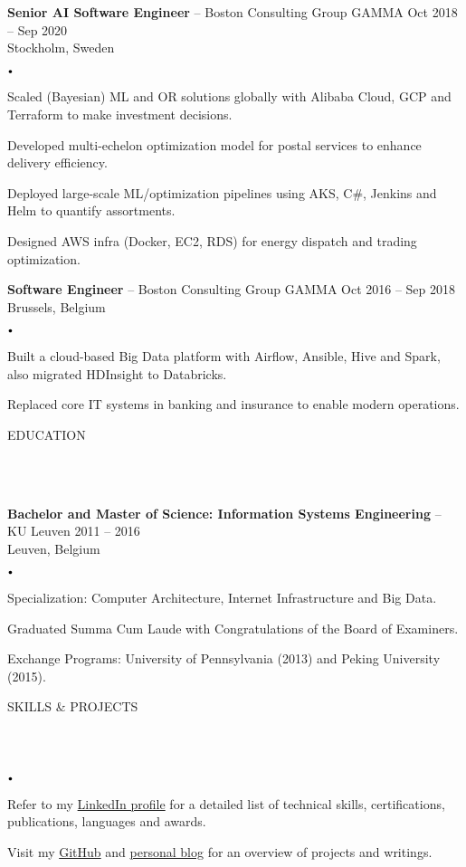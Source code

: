 \documentclass{article}
\newcommand{\header}[1]{
    {
        \hspace*{-4pt}
        \vspace*{8pt}
        \uppercase{#1}
    }
    \vspace*{-4pt} 
    \lineunder
    \vspace*{8pt}
}
\newcommand{\lineunder}{
    \vspace*{-8pt} \\ 
    \hspace*{-4pt} 
    \hrulefill \\
}
\newcommand{\experience}[5]{
    \vspace*{2pt}
    \textbf{#1} -- #2 \hfill #3 \\ 
    #4 \\
    #5
    \vspace*{2pt}
}
\newcommand{\spacedbullet}{
    $\vcenter{\hbox{\tiny$\bullet$}}$\hspace*{-2pt}
}
\newenvironment{bulletlist}{
    \begin{list}
        {\spacedbullet}{\setlength\leftmargin{10pt} 
        \topsep 0pt \itemsep -2pt}}{\vspace*{4pt}
    \end{list}
}
\begin{document}
\experience{Senior AI Software Engineer}{Boston Consulting Group GAMMA}{Oct 2018 -- Sep 2020}{Stockholm, Sweden}
{
    \begin{bulletlist}
        \item Scaled (Bayesian) ML and OR solutions globally with Alibaba Cloud, GCP and Terraform to make investment decisions.
        \item Developed multi-echelon optimization model for postal services to enhance delivery efficiency.
        \item Deployed large-scale ML/optimization pipelines using AKS, C\#, Jenkins and Helm to quantify assortments.
        \item Designed AWS infra (Docker, EC2, RDS) for energy dispatch and trading optimization.
    \end{bulletlist}
}

\experience{Software Engineer}{Boston Consulting Group GAMMA}{Oct 2016 -- Sep 2018}{Brussels, Belgium}
{
    \begin{bulletlist}
        \item Built a cloud-based Big Data platform with Airflow, Ansible, Hive and Spark, also migrated HDInsight to Databricks.
        \item Replaced core IT systems in banking and insurance to enable modern operations.
    \end{bulletlist}
}

\vspace*{4pt}

\header{Education}
\experience{Bachelor and Master of Science: Information Systems Engineering}{KU Leuven}{2011 -- 2016}{Leuven, Belgium}
{
    \begin{bulletlist}
        \item Specialization: Computer Architecture, Internet Infrastructure and Big Data.
        \item Graduated Summa Cum Laude with Congratulations of the Board of Examiners.
        \item Exchange Programs: University of Pennsylvania (2013) and Peking University (2015).
    \end{bulletlist}
}

\vspace*{4pt}
\header{Skills \& Projects}
\begin{bulletlist}
    \item Refer to my \href{https://linkedin.com/in/nielsdegrande/}{LinkedIn profile} for a detailed list of technical skills, certifications, publications, languages and awards.
    \item Visit my \href{https://github.com/NielsDegrande/}{GitHub} and \href{https://niels.degran.de/blog}{personal blog} for an overview of projects and writings.
\end{bulletlist}
\end{document}
